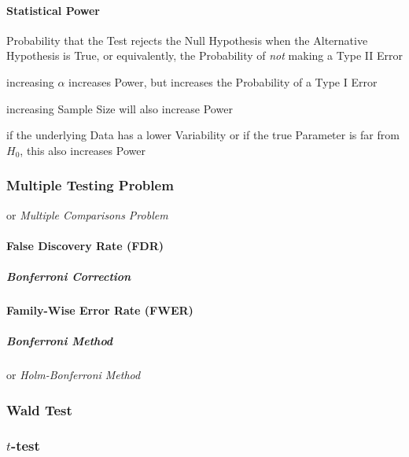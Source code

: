 \paragraph{Statistical Power}\label{sec:statistical_power}\hfill

Probability that the Test rejects the Null Hypothesis when the Alternative
Hypothesis is True, or equivalently, the Probability of \emph{not} making a Type
II Error

increasing $\alpha$ increases Power, but increases the Probability of a Type I
Error

increasing Sample Size will also increase Power

if the underlying Data has a lower Variability or if the true Parameter is far
from $H_0$, this also increases Power



\subsubsection{Multiple Testing Problem}\label{sec:multiple_testing}

or \emph{Multiple Comparisons Problem}




\paragraph{False Discovery Rate (FDR)}\label{sec:fdr}\hfill

\subparagraph{Bonferroni Correction}\label{sec:bonferroni_correction}\hfill



\paragraph{Family-Wise Error Rate (FWER)}\label{sec:fwer}\hfill

\subparagraph{Bonferroni Method}\label{sec:bonferroni_method}\hfill

or \emph{Holm-Bonferroni Method}



\subsubsection{Wald Test}\label{sec:wald_test}

\subsubsection{$t$-test}\label{sec:t_test}

